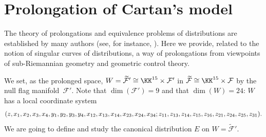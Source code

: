 \section{Prolongation of Cartan's model}
\label{Prolongation-of-Cartan's-$(8, 15)$-distribution}

The theory of prolongations and equivalence problems of distributions are established by many authors (see, for instance,
\cite{BCGGG, Montgomery, Morimoto, Tanaka1}).
Here we provide, related to the notion of singular curves of distributions, a way of prolongations
from viewpoints of sub-Riemannian geometry and geometric control theory.

We set, as the prolonged space,
$W = \widetilde{\mathcal F}' \cong \KK^{15}\times {\mathcal F}'$
in $\widetilde{\mathcal F} \cong \KK^{15}\times {\mathcal F}$
by the null flag manifold~${\mathcal F}'$.
Note that $\dim({\mathcal F}') = 9$ and that $\dim(W) = 24$:
$W$ has a local coordinate system
\begin{gather*}
(z,\hspace{-0.2pt} x_1,\hspace{-0.2pt} x_2,\hspace{-0.2pt} x_3,\hspace{-0.2pt} x_4,\hspace{-0.2pt} y_1,\hspace{-0.2pt} y_2,\hspace{-0.2pt} y_3,\hspace{-0.2pt} y_4,\hspace{-0.2pt} x_{12},\hspace{-0.2pt} x_{13},\hspace{-0.2pt} x_{14},\hspace{-0.2pt} x_{23},\hspace{-0.2pt} x_{24},\hspace{-0.2pt} x_{34};\hspace{-0.2pt}
z_{11},\hspace{-0.2pt} z_{13},\hspace{-0.2pt} z_{14},\hspace{-0.2pt} z_{15},\hspace{-0.2pt} z_{16},\hspace{-0.2pt} z_{21},\hspace{-0.2pt}
 z_{24},\hspace{-0.2pt} z_{25},\hspace{-0.2pt} z_{31}).
\end{gather*}
We are going to define and study the canonical distribution $E$ on $W = \widetilde{\mathcal F}'$.

